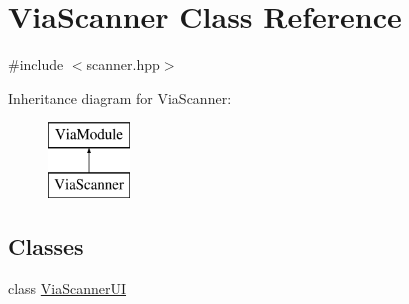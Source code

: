 \hypertarget{class_via_scanner}{}\section{Via\+Scanner Class Reference}
\label{class_via_scanner}


{\ttfamily \#include $<$scanner.\+hpp$>$}

Inheritance diagram for Via\+Scanner\+:\begin{figure}[H]
\begin{center}
\leavevmode
\includegraphics[height=2.000000cm]{class_via_scanner}
\end{center}
\end{figure}
\subsection*{Classes}
\begin{DoxyCompactItemize}
\item 
class \mbox{\hyperlink{class_via_scanner_1_1_via_scanner_u_i}{Via\+Scanner\+UI}}
\end{DoxyCompactItemize}
